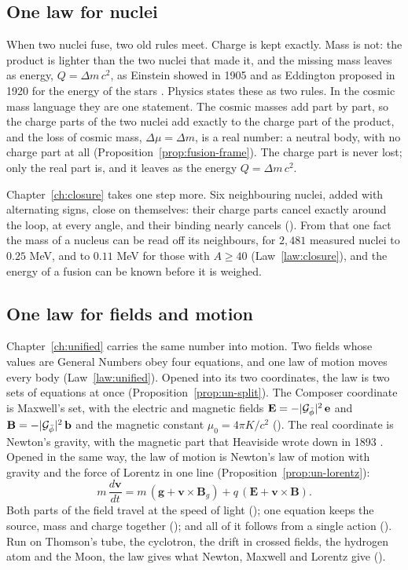 \subsection{One law for nuclei}\label{subsec:al-nuclei}

When two nuclei fuse, two old rules meet. Charge is kept exactly. Mass is not: the product is lighter than the two nuclei that made it, and the missing mass leaves as energy, $Q = \Delta m\,c^2$, as Einstein showed in 1905 \citep{Einstein1905} and as Eddington proposed in 1920 for the energy of the stars \citep{Eddington1920}. Physics states these as two rules. In the cosmic mass language they are one statement. The cosmic masses add part by part, so the charge parts of the two nuclei add exactly to the charge part of the product, and the loss of cosmic mass, $\Delta\mu = \Delta m$, is a real number: a neutral body, with no charge part at all (Proposition~\ref{prop:fusion-frame}). The charge part is never lost; only the real part is, and it leaves as the energy $Q = \Delta m\,c^2$.

Chapter~\ref{ch:closure} takes one step more. Six neighbouring nuclei, added with alternating signs, close on themselves: their charge parts cancel exactly around the loop, at every angle, and their binding nearly cancels (). From that one fact the mass of a nucleus can be read off its neighbours, for $2{,}481$ measured nuclei to $0.25$ MeV, and to $0.11$ MeV for those with $A \ge 40$ (Law~\ref{law:closure}), and the energy of a fusion can be known before it is weighed.

\subsection{One law for fields and motion}\label{subsec:al-fields}

Chapter~\ref{ch:unified} carries the same number into motion. Two fields whose values are General Numbers obey four equations, and one law of motion moves every body (Law~\ref{law:unified}). Opened into its two coordinates, the law is two sets of equations at once (Proposition~\ref{prop:un-split}). The Composer coordinate is Maxwell's set, with the electric and magnetic fields $\mathbf{E} = -|\mathcal{G}_{\bar{\phi}}|^2\,\mathbf{e}$ and $\mathbf{B} = -|\mathcal{G}_{\bar{\phi}}|^2\,\mathbf{b}$ and the magnetic constant $\mu_0 = 4\pi K/c^2$ (). The real coordinate is Newton's gravity, with the magnetic part that Heaviside wrote down in 1893 \citep{Heaviside1893}. Opened in the same way, the law of motion is Newton's law of motion with gravity and the force of Lorentz in one line (Proposition~\ref{prop:un-lorentz}):
\[
m\,\frac{d\mathbf{v}}{dt} = m\,(\mathbf{g} + \mathbf{v}\times\mathbf{B}_g) + q\,(\mathbf{E} + \mathbf{v}\times\mathbf{B}) .
\]
Both parts of the field travel at the speed of light (); one equation keeps the source, mass and charge together (); and all of it follows from a single action (). Run on Thomson's tube, the cyclotron, the drift in crossed fields, the hydrogen atom and the Moon, the law gives what Newton, Maxwell and Lorentz give ().

